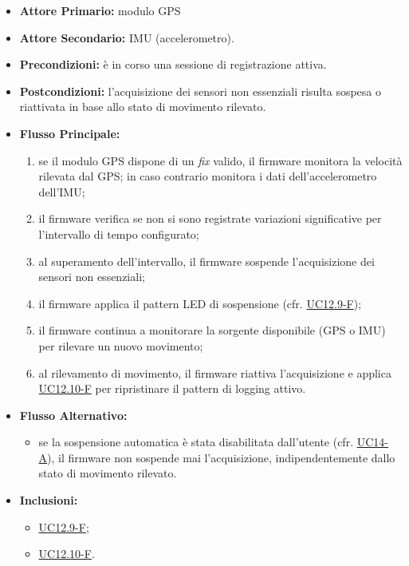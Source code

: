 \begin{itemize}
    \item \textbf{Attore Primario:} modulo GPS 
    
    \item \textbf{Attore Secondario:} IMU (accelerometro).

    \item \textbf{Precondizioni:} è in corso una sessione di registrazione attiva.

    \item \textbf{Postcondizioni:} l'acquisizione dei sensori non essenziali risulta sospesa o
    riattivata in base allo stato di movimento rilevato.

    \item \textbf{Flusso Principale:}
    \begin{enumerate}
        \item se il modulo GPS dispone di un \textit{fix} valido, il firmware monitora la velocità
        rilevata dal GPS; in caso contrario monitora i dati dell'accelerometro dell'IMU;
        \item il firmware verifica se non si sono registrate variazioni significative per
        l'intervallo di tempo configurato;
        \item al superamento dell'intervallo, il firmware sospende l'acquisizione dei sensori non
        essenziali;
        \item il firmware applica il pattern LED di sospensione (cfr. \hyperref[uc:uc_led_sospensione]{UC12.9-F});
        \item il firmware continua a monitorare la sorgente disponibile (GPS o IMU) per rilevare un
        nuovo movimento;
        \item al rilevamento di movimento, il firmware riattiva l'acquisizione e applica
        \hyperref[uc:uc_led_logging]{UC12.10-F} per ripristinare il pattern di logging attivo.
    \end{enumerate}

    \item \textbf{Flusso Alternativo:}
    \begin{itemize}
        \item se la sospensione automatica è stata disabilitata dall'utente (cfr.
        \hyperref[uc:uc_config_timeout]{UC14-A}), il firmware non sospende mai l'acquisizione,
        indipendentemente dallo stato di movimento rilevato.
    \end{itemize}

    \item \textbf{Inclusioni:}
    \begin{itemize}
        \item \hyperref[uc:uc_led_sospensione]{UC12.9-F};
        \item \hyperref[uc:uc_led_logging]{UC12.10-F}.
    \end{itemize}
\end{itemize}

